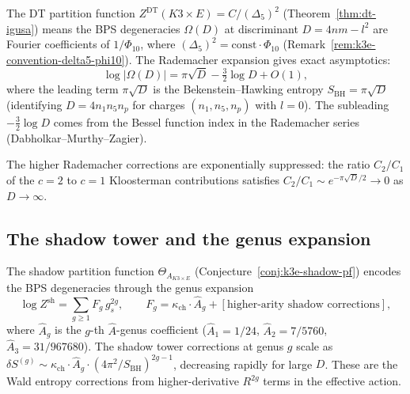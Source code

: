 The DT partition function $Z^{\mathrm{DT}}(K3 \times E) = C / (\Delta_5)^2$ (Theorem~\ref{thm:dt-igusa}) means the BPS degeneracies $\Omega(D)$ at discriminant $D = 4nm - l^2$ are Fourier coefficients of $1/\Phi_{10}$, where $(\Delta_5)^2 = \mathrm{const} \cdot \Phi_{10}$ (Remark~\ref{rem:k3e-convention-delta5-phi10}). The Rademacher expansion gives exact asymptotics:
\begin{equation}
\label{eq:k3e-rademacher}
 \log|\Omega(D)| = \pi\sqrt{D} - \tfrac{3}{2} \log D + O(1),
\end{equation}
where the leading term $\pi\sqrt{D}$ is the Bekenstein--Hawking entropy $S_{\mathrm{BH}} = \pi\sqrt{D}$ (identifying $D = 4n_1 n_5 n_p$ for charges $(n_1, n_5, n_p)$ with $l = 0$). The subleading $-\frac{3}{2}\log D$ comes from the Bessel function index in the Rademacher series (Dabholkar--Murthy--Zagier).

The higher Rademacher corrections are exponentially suppressed: the ratio $C_2/C_1$ of the $c = 2$ to $c = 1$ Kloosterman contributions satisfies $C_2/C_1 \sim e^{-\pi\sqrt{D}/2} \to 0$ as $D \to \infty$.

\subsection{The shadow tower and the genus expansion}
\label{subsec:k3e-shadow-entropy}

The shadow partition function $\Theta_{A_{K3 \times E}}$ (Conjecture~\ref{conj:k3e-shadow-pf}) encodes the BPS degeneracies through the genus expansion
\begin{equation}
\label{eq:k3e-genus-expansion}
 \log Z^{\mathrm{sh}} = \sum_{g \geq 1} F_g \, g_s^{2g},
 \qquad
 F_g = \kappa_{\mathrm{ch}} \cdot \hat{A}_g + [\text{higher-arity shadow corrections}],
\end{equation}
where $\hat{A}_g$ is the $g$-th $\hat{A}$-genus coefficient ($\hat{A}_1 = 1/24$, $\hat{A}_2 = 7/5760$, $\hat{A}_3 = 31/967680$). The shadow tower corrections at genus $g$ scale as $\delta S^{(g)} \sim \kappa_{\mathrm{ch}} \cdot \hat{A}_g \cdot (4\pi^2/S_{\mathrm{BH}})^{2g-1}$, decreasing rapidly for large $D$. These are the Wald entropy corrections from higher-derivative $R^{2g}$ terms in the effective action.

